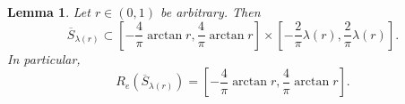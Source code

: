 \documentclass{amsart}
\newtheorem{lemma}{Lemma}
\begin{document}
\begin{lemma}\label{lem:hypdisk}
Let $r\in(0,1)$ be arbitrary. Then
\begin{equation}\label{}
\overline{S}_{\lambda(r)}\subset\displaystyle\left[-\frac{4}{\pi}\arctan{r},\frac{4}{\pi}\arctan{r}\right]\times\left[-\frac{2}{\pi}\lambda(r),\frac{2}{\pi}\lambda(r)\right].
\end{equation}
In particular,
\begin{equation}\label{hypdisk:fla0}
    R_{e}(\overline{S}_{\lambda(r)})=\displaystyle\left[-\frac{4}{\pi}\arctan{r},\frac{4}{\pi}\arctan{r}\right].
\end{equation}

\end{lemma}
\end{document}
